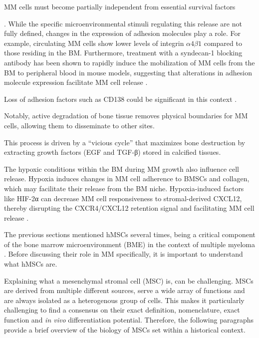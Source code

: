 MM cells must become partially independent from
essential survival factors

. While the specific
microenvironmental stimuli regulating this release are not fully defined,
changes in the expression of adhesion molecules play a role. For example,
circulating MM cells show lower levels of integrin $\alpha4\beta1$
compared to those residing in the BM. Furthermore, treatment with a syndecan-1 blocking antibody
has been shown to rapidly induce the mobilization of MM cells from the BM to
peripheral blood in mouse models, suggesting that alterations in adhesion
molecule expression facilitate MM cell release
\cite{zeissigTumourDisseminationMultiple2020}.



Loss of adhesion
factors such as CD138 could be significant in this context
\cite{akhmetzyanovaDynamicCD138Surface2020,
    brandlJunctionalAdhesionMolecule2022}.

Notably, active degradation of bone tissue removes physical boundaries for MM
cells, allowing them to disseminate to other sites.


This process is driven by a
``vicious cycle'' that maximizes bone destruction by extracting growth factors
(EGF and TGF-β) stored in calcified tissues.

The hypoxic conditions within the BM during MM growth also influence cell
release. Hypoxia induces changes in MM cell adherence to BMSCs and collagen,
which may facilitate their release from the BM niche. Hypoxia-induced factors
like HIF-2α can decrease MM cell responsiveness to stromal-derived CXCL12,
thereby disrupting the CXCR4/CXCL12 retention signal and facilitating MM cell
release \cite{zeissigTumourDisseminationMultiple2020}.







%
\label{sec:intro_hMSCs}%
The previous sections mentioned hMSCs several times, being a critical component
of the bone marrow microenvironment (BME) in the context of multiple myeloma
 \cite{mangoliniBoneMarrowStromal2020}. Before discussing their role in MM
 specifically, it is important to understand what hMSCs are.

Explaining what a mesenchymal stromal cell (MSC) is, can be challenging. MSCs
are derived from multiple different sources, serve a wide array of functions and
are always isolated as a heterogenous group of cells. This makes it particularly
challenging to find a consensus on their exact definition, nomenclature, exact
function and \textit{in vivo} differentiation potential. Therefore, the
following paragraphs provide a brief overview of the biology of MSCs set within
a historical context.

